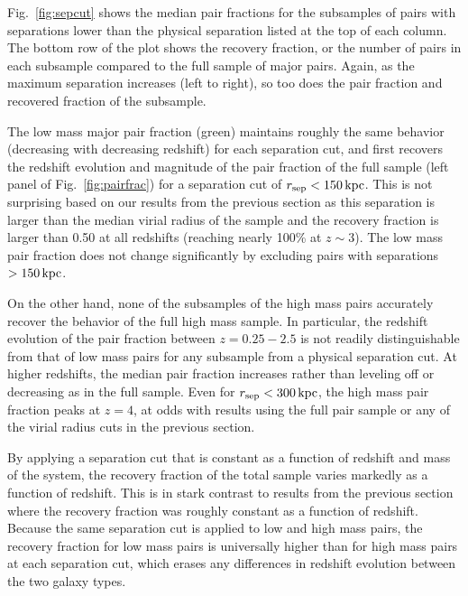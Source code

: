 \documentclass[twocolumn]{aastex631}
\begin{document}
    Fig.~\ref{fig:sepcut} shows the median pair fractions for the subsamples of pairs with separations lower than the physical separation listed at the top of each column. 
    The bottom row of the plot shows the recovery fraction, or the number of pairs in each subsample compared to the full sample of major pairs. 
    Again, as the maximum separation increases (left to right), so too does the pair fraction and recovered fraction of the subsample. 
    
    The low mass major pair fraction (green) maintains roughly the same behavior (decreasing with decreasing redshift) for each separation cut, and first recovers the redshift evolution and magnitude of the pair fraction of the full sample (left panel of Fig.~\ref{fig:pairfrac}) for a separation cut of $r_{\mathrm{sep}} < 150\mathrm{\,kpc}$. 
    This is not surprising based on our results from the previous section as this separation is larger than the median virial radius of the sample and the recovery fraction is larger than 0.50 at all redshifts (reaching nearly 100\% at $z\sim3$).  
    The low mass pair fraction does not change significantly by excluding pairs with separations $>150\mathrm{\,kpc}$.

    On the other hand, none of the subsamples of the high mass pairs accurately recover the behavior of the full high mass sample. 
    In particular, the redshift evolution of the pair fraction between $z=0.25-2.5$ is not readily distinguishable from that of low mass pairs for any subsample from a physical separation cut.
    At higher redshifts, the median pair fraction increases rather than leveling off or decreasing as in the full sample.
    Even for $r_{\mathrm{sep}}<300\mathrm{\,kpc}$, the high mass pair fraction peaks at $z=4$, at odds with results using the full pair sample or any of the virial radius cuts in the previous section. 

    By applying a separation cut that is constant as a function of redshift and mass of the system, the recovery fraction of the total sample varies markedly as a function of redshift.  
    This is in stark contrast to results from the previous section where the recovery fraction was roughly constant as a function of redshift.
    Because the same separation cut is applied to low and high mass pairs, the recovery fraction for low mass pairs is universally higher than for high mass pairs at each separation cut, which erases any differences in redshift evolution between the two galaxy types.
    
    
\end{document}
